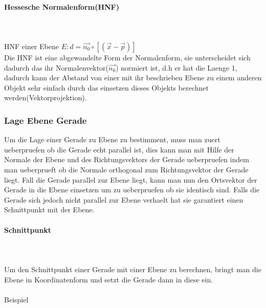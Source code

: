 \documentclass[a4paper]{article} %
\begin{document}
	\paragraph{Hessesche Normalenform(HNF)}
	\hspace{0 cm} \\ \noindent \\
	HNF einer Ebene $E : d = \vec{n_0}\circ\left[\left(\vec{x}-\vec{p}\right)   \right]$\\
	Die HNF ist eine abgewandelte Form der Normalenform, sie unterscheidet sich dadurch das ihr Normalenvektor($\vec{n_0}$)
	normiert ist, d.h er hat die Laenge 1, dadurch kann der Abstand von einer mit ihr beschrieben Ebene zu einem anderen Objekt sehr einfach durch das einsetzen dieses Objekts berechnet werden(Vektorprojektion).
	\subsubsection{Lage Ebene Gerade}
	Um die Lage einer Gerade zu Ebene zu bestimment, muss man zuert ueberpruefen ob die Gerade echt parallel ist, dies kann man mit Hilfe der Normale der Ebene und des Richtungsvektors der Gerade ueberpruefen indem man ueberprueft ob die Normale orthogonal zum Richtungsvektor der Gerade liegt.
	Fall die Gerade parallel zur Ebene liegt, kann man nun den Ortsvektor der Gerade in die Ebene einsetzen um zu ueberpruefen ob sie identisch sind.
	Falls die Gerade sich jedoch nicht parallel zur Ebene verhaelt hat sie garantiert einen Schnittpunkt mit der Ebene.
	\paragraph{Schnittpunkt}
		\hspace{0 cm} \\ \noindent \\
		Um den Schnittpunkt einer Gerade mit einer Ebene zu berechnen, bringt man die Ebene in Koordinatenform und setzt die Gerade dann in diese ein.
		\\\\Beispiel
\end{document}

